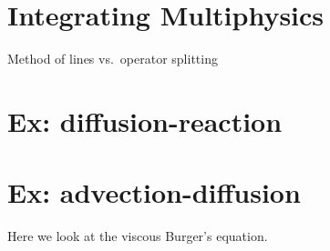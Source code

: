 
\begin{quote}
\end{quote}

\section{Integrating Multiphysics}

Method of lines vs.\ operator splitting


\section{Ex: diffusion-reaction}

\section{Ex: advection-diffusion}

Here we look at the viscous Burger's equation.


